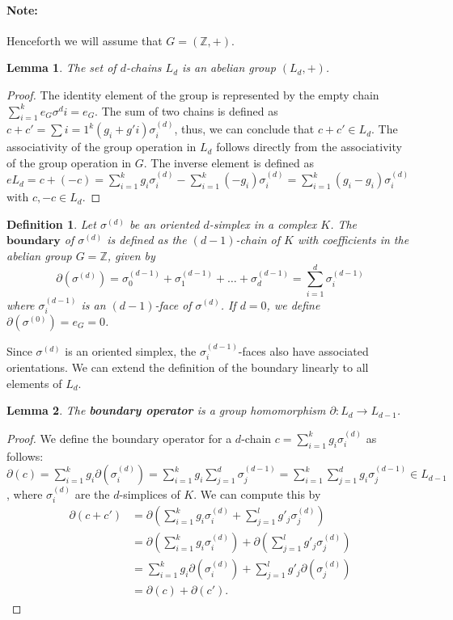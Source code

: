 \documentclass{article}
\newtheorem*{definition}{Definition}
\newtheorem*{lemma}{Lemma}
\begin{document}
\paragraph{Note:} Henceforth we will assume that $G = (\mathbb{Z},+)$.

\begin{lemma}
The set of $d$-chains $L_d$ is an abelian group $(L_d,+)$.
\end{lemma}
\begin{proof}
The identity element of the group is represented by the empty chain $\sum_{i=1}^{k} e_G \sigma^{d}i = e_G$. The sum of two chains is defined as $c+c' = \sum{i=1}^{k} (g_i+g'i) \sigma_i^{(d)}$, thus, we can conclude that $c+c' \in L_d$. The associativity of the group operation in $L_d$ follows directly from the associativity of the group operation in $G$. The inverse element is defined as $e{L_d} = c + (-c) = \sum_{i=1}^{k} g_i \sigma_i^{(d)} - \sum_{i=1}^{k} (-g_i) \sigma_i^{(d)} = \sum_{i=1}^{k} (g_i-g_i) \sigma_i^{(d)}$ with $c,-c \in L_d$.
\end{proof}

\begin{definition}
Let $\sigma^{(d)}$ be an oriented $d$-simplex in a complex $K$. The $\textbf{boundary}$ of $\sigma^{(d)}$ is defined as the $(d-1)$-chain of $K$ with coefficients in the abelian group $G = \mathbb{Z}$, given by
\begin{equation}
\partial(\sigma^{(d)}) = \sigma^{(d-1)}_0 + \sigma^{(d-1)}_1 + \ldots + \sigma^{(d-1)}_d = \sum_{i=1}^{d} \sigma^{(d-1)}_i
\end{equation}
where $\sigma^{(d-1)}_i$ is an $(d-1)$-face of $\sigma^{(d)}$. If $d=0$, we define $\partial(\sigma^{(0)}) = e_G = 0$.
\end{definition}

Since $\sigma^{(d)}$ is an oriented simplex, the $\sigma^{(d-1)}_i$-faces also have associated orientations. We can extend the definition of the boundary linearly to all elements of $L_d$.

\begin{lemma}
The \textbf{boundary operator} is a group homomorphism $\partial: L_d \rightarrow L_{d-1}$.
\end{lemma}
\begin{proof}
We define the boundary operator for a $d$-chain $c = \sum_{i=1}^{k} g_i \sigma_i^{(d)}$ as follows: $\partial(c) = \sum_{i=1}^{k} g_i \partial(\sigma_i^{(d)}) = \sum_{i=1}^{k} g_i \sum_{j=1}^{d} \sigma_j^{(d-1)} = \sum_{i=1}^{k} \sum_{j=1}^{d} g_i \sigma_j^{(d-1)} \in L_{d-1}$, where $\sigma_i^{(d)}$ are the $d$-simplices of $K$. We can compute this by
\begin{align}
\partial(c + c') &= \partial(\sum_{i=1}^{k} g_i \sigma_i^{(d)} + \sum_{j=1}^{l} g'_j \sigma_j^{(d)}) \\
&= \partial\left(\sum_{i=1}^{k} g_i \sigma_i^{(d)}\right) + \partial\left(\sum_{j=1}^{l} g'_j \sigma_j^{(d)}\right) \\
&= \sum_{i=1}^{k} g_i \partial(\sigma_i^{(d)}) + \sum_{j=1}^{l} g'_j \partial(\sigma_j^{(d)}) \\
&= \partial(c) + \partial(c').
\end{align}
\end{proof}
\end{document}
